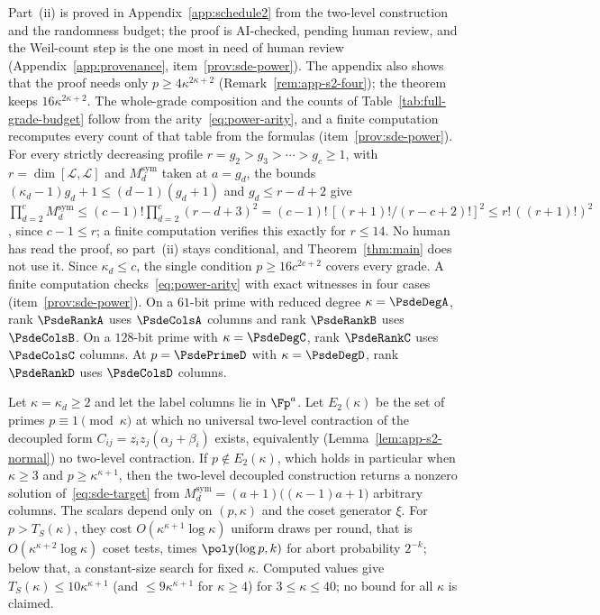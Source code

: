 Part~(ii) is proved in Appendix~\ref{app:schedule2} from the two-level construction and the randomness budget; the proof is AI-checked, pending human review, and the Weil-count step is the one most in need of human review (Appendix~\ref{app:provenance}, item~\ref{prov:sde-power}). The appendix also shows that the proof needs only $p \ge 4\kappa^{2\kappa+2}$ (Remark~\ref{rem:app-s2-four}); the theorem keeps $16\kappa^{2\kappa+2}$. The whole-grade composition and the counts of Table~\ref{tab:full-grade-budget} follow from the arity~\eqref{eq:power-arity}, and a finite computation recomputes every count of that table from the formulas (item~\ref{prov:sde-power}). For every strictly decreasing profile $r = g_2 > g_3 > \cdots > g_c \ge 1$, with $r = \dim[\mathcal{L},\mathcal{L}]$ and $M_d^{\mathrm{sym}}$ taken at $a = g_d$, the bounds $(\kappa_d-1)g_d+1 \le (d-1)(g_d+1)$ and $g_d \le r-d+2$ give $\prod_{d=2}^c M_d^{\mathrm{sym}} \le (c-1)!\prod_{d=2}^c(r-d+3)^2 = (c-1)!\,[(r+1)!/(r-c+2)!]^2 \le r!\,((r+1)!)^2$, since $c-1 \le r$; a finite computation verifies this exactly for $r \le 14$. No human has read the proof, so part~(ii) stays conditional, and Theorem~\ref{thm:main} does not use it. Since $\kappa_d \le c$, the single condition $p \ge 16c^{2c+2}$ covers every grade. A finite computation checks~\eqref{eq:power-arity} with exact witnesses in four cases (item~\ref{prov:sde-power}). On a $61$-bit prime with reduced degree $\kappa = \PsdeDegA$, rank $\PsdeRankA$ uses $\PsdeColsA$ columns and rank $\PsdeRankB$ uses $\PsdeColsB$. On a $128$-bit prime with $\kappa = \PsdeDegC$, rank $\PsdeRankC$ uses $\PsdeColsC$ columns. At $p = \PsdePrimeD$ with $\kappa = \PsdeDegD$, rank $\PsdeRankD$ uses $\PsdeColsD$ columns.

\begin{proposition}
\label{prop:decoupled-sde}
Let $\kappa = \kappa_d \ge 2$ and let the label columns lie in $\Fp^{a}$. Let $E_2(\kappa)$ be the set of primes $p \equiv 1 \pmod\kappa$ at which no universal two-level contraction of the decoupled form $C_{ij} = z_iz_j(\alpha_j + \beta_i)$ exists, equivalently (Lemma~\ref{lem:app-s2-normal}) no two-level contraction. If $p \notin E_2(\kappa)$, which holds in particular when $\kappa \ge 3$ and $p \ge \kappa^{\kappa+1}$, then the two-level decoupled construction returns a nonzero solution of~\eqref{eq:sde-target} from $M_d^{\mathrm{sym}} = (a+1)\bigl((\kappa-1)a+1\bigr)$ arbitrary columns. The scalars depend only on $(p,\kappa)$ and the coset generator $\xi$. For $p > T_S(\kappa)$, they cost $O(\kappa^{\kappa+1}\log\kappa)$ uniform draws per round, that is $O(\kappa^{\kappa+2}\log\kappa)$ coset tests, times $\poly(\log p, k)$ for abort probability $2^{-k}$; below that, a constant-size search for fixed $\kappa$. Computed values give $T_S(\kappa) \le 10\kappa^{\kappa+1}$ (and $\le 9\kappa^{\kappa+1}$ for $\kappa \ge 4$) for $3 \le \kappa \le 40$; no bound for all $\kappa$ is claimed.
\end{proposition}

